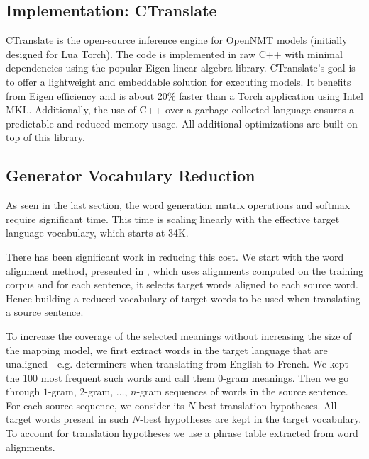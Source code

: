 \documentclass[11pt,a4paper]{article}
\begin{document}
\subsection{Implementation: CTranslate}

CTranslate is the open-source
inference engine for OpenNMT models (initially designed for Lua Torch).  The
code is implemented in raw C++ with minimal dependencies using the
popular Eigen linear algebra library. CTranslate's goal is to offer a
lightweight and embeddable solution for executing models. It benefits
from Eigen efficiency and is about 20\% faster than a Torch
application using Intel MKL. Additionally, the use of C++ over a
garbage-collected language ensures a predictable and reduced memory
usage. All additional optimizations are built on top of this library.


\subsection{Generator Vocabulary Reduction}

As seen in the last section, the word generation matrix operations and softmax require significant time. This time is scaling linearly with the effective target language vocabulary, which starts at 34K.

There has been significant work in reducing this cost. We start with the word alignment method, presented in , which uses alignments computed on the training corpus and for each sentence, it selects target words aligned to each source word. Hence building a reduced vocabulary of target words to be used when translating a source sentence.


To increase the coverage of the selected meanings without increasing the size of the mapping model, we first extract words in the target language that are unaligned - e.g. determiners when translating from English to French. We kept the 100 most frequent such words and call them $0$-gram meanings. Then we go through $1$-gram, $2$-gram, $\ldots$, $n$-gram sequences of words in the source sentence. For each source sequence, we consider its $N$-best translation hypotheses. All target words present in such $N$-best hypotheses are kept in the target vocabulary. To account for translation hypotheses we use a phrase table extracted from word alignments.
\end{document}
